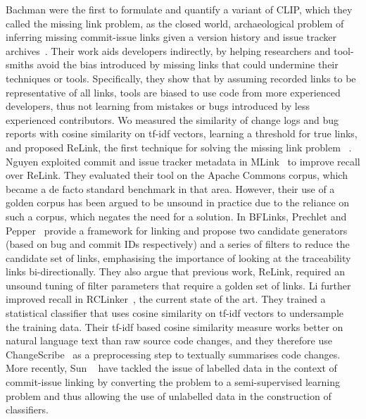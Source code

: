 Bachman \etal were the first to formulate and quantify a variant of CLIP, which
they called the missing link problem, as the closed world, archaeological
problem of inferring missing commit-issue links given a version history and
issue tracker archives~\cite{Bird2009,MissingLinks}. Their work aids developers
indirectly, by helping researchers and tool-smiths avoid the bias introduced by
missing links that could undermine their techniques or tools. Specifically, they
show that by assuming recorded links to be representative of all links, tools
are biased to use code from more experienced developers, thus not learning from
mistakes or bugs introduced by less experienced contributors. Wo \etal measured
the similarity of change logs and bug reports with cosine similarity on tf-idf
vectors, learning a threshold for true links, and proposed ReLink, the first
technique for solving the missing link problem ~\cite{relink}. Nguyen \etal
exploited commit and issue tracker metadata in MLink~\cite{MLink} to improve
recall over ReLink. They evaluated their tool on the Apache Commons corpus,
which became a de facto standard benchmark in that area. However, their use of a
golden corpus has been argued to be unsound in practice due to the reliance on
such a corpus, which negates the need for a solution. In BFLinks, Prechlet and
Pepper~\cite{Prechelt2014} provide a framework for linking and propose two
candidate generators (based on bug and commit IDs respectively) and a series of
filters to reduce the candidate set of links, emphasising the importance of
looking at the traceability links bi-directionally. They also argue that
previous work, ReLink, required an unsound tuning of filter parameters that
require a golden set of links. Li \etal further improved recall in
RCLinker~\cite{RCLinker}, the current state of the art. They trained a
statistical classifier that uses cosine similarity on tf-idf vectors to
undersample the training data.  Their tf-idf based cosine similarity measure
works better on natural language text than raw source code changes, and they
therefore use ChangeScribe~\cite{ChangeScribe} as a preprocessing step to
textually summarises code changes. More recently, Sun \etal~\cite{PULink} have
tackled the issue of labelled data in the context of commit-issue linking by
converting the problem to a semi-supervised learning problem and thus allowing
the use of unlabelled data in the construction of classifiers.

